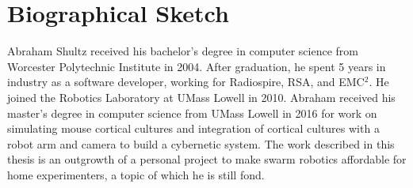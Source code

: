 
\section{Biographical Sketch}
Abraham Shultz received his bachelor's degree in computer science from Worcester Polytechnic Institute in 2004.
After graduation, he spent 5 years in industry as a software developer, working for Radiospire, RSA, and EMC$^2$.
He joined the Robotics Laboratory at UMass Lowell in 2010. 
Abraham received his master's degree in computer science from UMass Lowell in 2016 for work on simulating mouse cortical cultures and integration of cortical cultures with a robot arm and camera to build a cybernetic system. 
The work described in this thesis is an outgrowth of a personal project to make swarm robotics affordable for home experimenters, a topic of which he is still fond. 